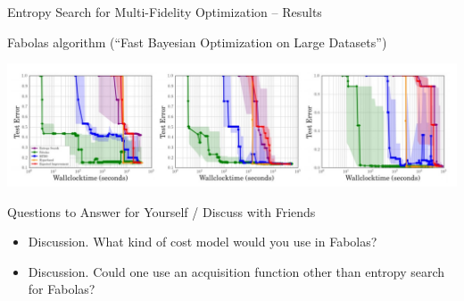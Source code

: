 \begin{frame}[c]{Entropy Search for Multi-Fidelity Optimization -- Results}

\alert{Fabolas} algorithm (``Fast Bayesian Optimization on Large Datasets'')

\centering
\includegraphics[width=1.\textwidth]{../w07_hpo_speedup/images/fabolas/fabolas_results.jpg}

\pause
\bigskip


\end{frame}


\begin{frame}{Questions to Answer for Yourself / Discuss with Friends}

\bigskip

\begin{itemize}
    \item \alert{Discussion.} What kind of cost model would you use in Fabolas?
\medskip
	\item \alert{Discussion.} Could one use an acquisition function other than entropy search for Fabolas?    

\end{itemize}

\end{frame}